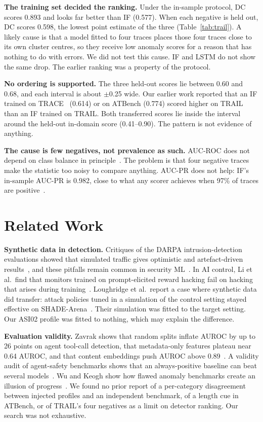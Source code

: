 \documentclass[conference]{IEEEtran}
\begin{document}
\textbf{The training set decided the ranking.} Under the in-sample protocol, DC scores 0.893 and looks far better than IF (0.577). When each negative is held out, DC scores 0.598, the lowest point estimate of the three (Table~\ref{tab:trail}). A likely cause is that a model fitted to four traces places those four traces close to its own cluster centres, so they receive low anomaly scores for a reason that has nothing to do with errors. We did not test this cause. IF and LSTM do not show the same drop. The earlier ranking was a property of the protocol.

\textbf{No ordering is supported.} The three held-out scores lie between 0.60 and 0.68, and each interval is about $\pm$0.25 wide. Our earlier work reported that an IF trained on TRACE~\cite{pan2024trace} (0.614) or on ATBench (0.774) scored higher on TRAIL than an IF trained on TRAIL. Both transferred scores lie inside the interval around the held-out in-domain score (0.41--0.90). The pattern is not evidence of anything.

\textbf{The cause is few negatives, not prevalence as such.} AUC-ROC does not depend on class balance in principle~\cite{hanley1982meaning, mcdermott2024closer}. The problem is that four negative traces make the statistic too noisy to compare anything. AUC-PR does not help: IF's in-sample AUC-PR is 0.982, close to what any scorer achieves when 97\% of traces are positive~\cite{saito2015precision}.

\section{Related Work}

\textbf{Synthetic data in detection.} Critiques of the DARPA intrusion-detection evaluations showed that simulated traffic gives optimistic and artefact-driven results~\cite{mchugh2000testing, mahoney2003analysis}, and these pitfalls remain common in security ML~\cite{arp2022dos}. In AI control, Li et al.\ find that monitors trained on prompt-elicited reward hacking fail on hacking that arises during training~\cite{li2026prompt}. Loughridge et al.\ report a case where synthetic data did transfer: attack policies tuned in a simulation of the control setting stayed effective on SHADE-Arena~\cite{loughridge2025synthetic}. Their simulation was fitted to the target setting. Our ASI02 profile was fitted to nothing, which may explain the difference.

\textbf{Evaluation validity.} Zavrak shows that random splits inflate AUROC by up to 26 points on agent tool-call detection, that metadata-only features plateau near 0.64 AUROC, and that content embeddings push AUROC above 0.89~\cite{zavrak2026content}. A validity audit of agent-safety benchmarks shows that an always-positive baseline can beat several models~\cite{validity2026audit}. Wu and Keogh show how flawed anomaly benchmarks create an illusion of progress~\cite{wu2021current}. We found no prior report of a per-category disagreement between injected profiles and an independent benchmark, of a length cue in ATBench, or of TRAIL's four negatives as a limit on detector ranking. Our search was not exhaustive.
\end{document}
